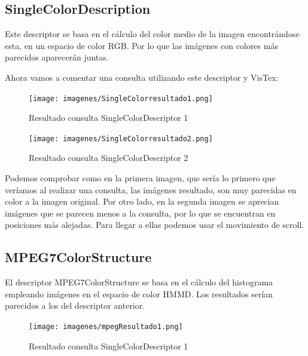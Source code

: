 \subsection{SingleColorDescription}

Este descriptor se basa en el cálculo del color medio de la imagen encontrándose esta, en un espacio de color RGB. Por lo que las imágenes con colores más parecidos aparecerán juntas.

Ahora vamos a comentar una consulta utilizando este descriptor y VisTex:

\begin{figure}[H] %
\centering
\texttt{[image: imagenes/SingleColorresultado1.png]}  %
\label{SingleColorresultado1.png}
\caption{Resultado consulta SingleColorDescriptor 1 }
\end{figure}

\begin{figure}[H] %
\centering
\texttt{[image: imagenes/SingleColorresultado2.png]}  %
\label{SingleColorresultado2.png}
\caption{Resultado consulta SingleColorDescriptor 2 }
\end{figure}

Podemos comprobar como en la primera imagen, que sería lo primero que veríamos al realizar una consulta, las imágenes resultado, son muy parecidas en color a la imagen original. Por otro lado, en la segunda imagen se aprecian imágenes que se parecen menos a la consulta, por lo que se encuentran en posiciones más alejadas. Para llegar a ellas podemos usar el movimiento de scroll.


\subsection{MPEG7ColorStructure}

El descriptor MPEG7ColorStructure se basa en el cálculo del histograma empleando imágenes en el espacio de color HMMD. Los resultados serían parecidos a los del descriptor anterior.

\begin{figure}[H] %
\centering
\texttt{[image: imagenes/mpegResultado1.png]}  %
\label{mpegResultado1.png}
\caption{Resultado consulta SingleColorDescriptor 1 }
\end{figure}

